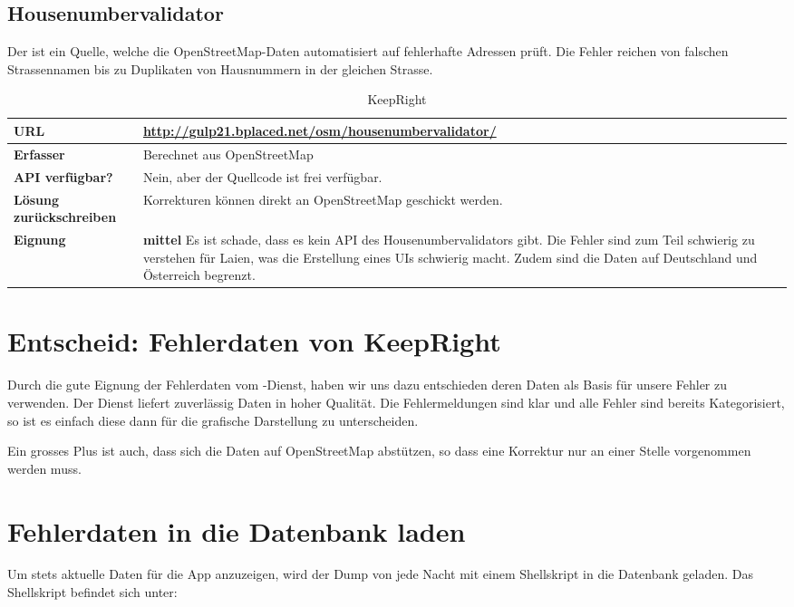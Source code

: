 \subsection{Housenumbervalidator}
Der  ist ein Quelle, welche die \gls{OpenStreetMap}-Daten automatisiert auf fehlerhafte Adressen prüft.
Die Fehler reichen von falschen Strassennamen bis zu Duplikaten von Hausnummern in der gleichen Strasse.

\begin{table}[H]
\centering
\begin{tabular}{|p{0.3\twocelltabwidth}|p{0.7\twocelltabwidth}|}
\hline 
\small{\textbf{URL}} & \url{http://gulp21.bplaced.net/osm/housenumbervalidator/} \\
\hline 
\small{\textbf{Erfasser}} & Berechnet aus \gls{OpenStreetMap} \\
\hline 
\small{\textbf{API verfügbar?}} & Nein, aber der Quellcode ist frei verfügbar. \\
\hline 
\small{\textbf{Lösung zurückschreiben}} & Korrekturen können direkt an \gls{OpenStreetMap} geschickt werden. \\
\hline
\small{\textbf{Eignung}} & \textbf{mittel} \linebreak Es ist schade, dass es kein API des Housenumbervalidators gibt. Die Fehler sind zum Teil schwierig zu verstehen für Laien, was die Erstellung eines UIs schwierig macht. Zudem sind die Daten auf Deutschland und Österreich begrenzt. \\
\hline
\end{tabular}
\caption{KeepRight}
\label{datenquellen-keepright}
\end{table}

\section{Entscheid: Fehlerdaten von KeepRight}
Durch die gute Eignung der Fehlerdaten vom -Dienst, haben wir uns dazu entschieden deren Daten als Basis für unsere Fehler zu verwenden.
Der Dienst liefert zuverlässig Daten in hoher Qualität.
Die Fehlermeldungen sind klar und alle Fehler sind bereits Kategorisiert, so ist es einfach diese dann für die grafische Darstellung zu unterscheiden.

Ein grosses Plus ist auch, dass sich die Daten auf \gls{OpenStreetMap} abstützen, so dass eine Korrektur nur an einer Stelle vorgenommen werden muss.

\section{Fehlerdaten in die Datenbank laden}
Um stets aktuelle Daten für die App anzuzeigen, wird der Dump von  jede Nacht mit einem Shellskript in die Datenbank geladen.
Das Shellskript befindet sich unter:

